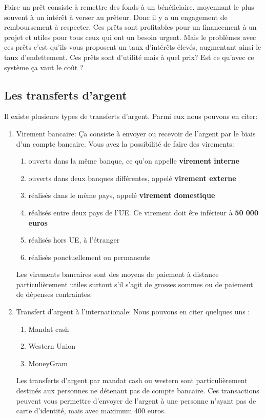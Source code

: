 \documentclass[12pt]{report}
\begin{document}
\hspace{1cm} Faire un prêt consiste à remettre des fonds à un bénéficiaire, moyennant le plus souvent à un intérêt à verser au prêteur. Donc il y a un engagement de remboursement à respecter. Ces prêts sont profitables pour un financement à un projet et utiles pour tous ceux qui ont un besoin urgent. Mais le problèmes avec ces prêts c'est qu'ils vous proposent un taux d'intérêts élevés, augmentant ainsi le taux d'endettement. Ces prêts sont d'utilité mais à quel prix? Est ce qu'avec ce système ça vaut le coût ?


    \subsection{Les transferts d'argent}
    
Il existe plusieurs types de transferts  d'argent. Parmi eux nous pouvons en citer: 

\begin{enumerate}
    \item Virement bancaire: Ça consiste à envoyer ou recevoir de l'argent par le biais d'un compte bancaire. Vous avez la possibilité de faire des virements: 
    
    \begin{enumerate}
        \item ouverts dans la même banque, ce qu'on appelle \textbf{virement interne}
        \item ouverts dans deux banques différentes, appelé \textbf{virement externe}
        \item réalisés dans le même pays, appelé \textbf{virement domestique}
        \item réalisés entre deux pays de l'UE. Ce virement doit êre inférieur à \textbf{50 000 euros}
        \item réalisés hors UE, à l'étranger
        \item réalisés ponctuellement ou permanents 
    \end{enumerate}
Les virements bancaires sont des moyens de paiement à distance particulièrement utiles surtout s'il s'agit de grosses sommes ou de paiement de dépenses contraintes. \\

    \item Transfert d'argent à l'internationale: Nous pouvons en citer quelques uns : 
    
    \begin{enumerate}
        \item Mandat cash
        \item Western Union
        \item MoneyGram 
    \end{enumerate}
    
Les transferts d'argent par mandat cash ou western sont particulièrement destinés aux personnes ne détenant pas de compte bancaire. Ces transactions peuvent vous permettre d'envoyer de l'argent à une personne n'ayant pas de carte d'identité, mais avec maximum 400 euros.\\
    
\end{enumerate}
\end{document}
